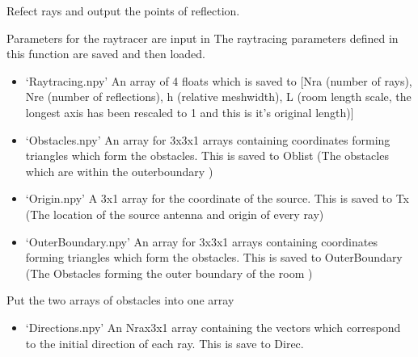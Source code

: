 \documentclass[letterpaper,10pt,english]{sphinxmanual}
\begin{document}
\begin{fulllineitems}
\label{\detokenize{index:RayTracerMainProgram.RayTracer}}
Refect rays and output the points of reflection.

Parameters for the raytracer are input in   {\hyperref[\detokenize{index:ParameterInput.DeclareParameters}]{}} The raytracing   parameters defined in this function are saved and then loaded.
\begin{itemize}
\item {} 
‘Raytracing.npy’ \sphinxhyphen{} An array of 4 floats which is saved to   {[}Nra (number of rays), Nre (number of reflections),   h (relative meshwidth),   L (room length scale, the longest axis has been rescaled to 1 and this   is it’s original length){]}

\item {} 
‘Obstacles.npy’  \sphinxhyphen{} An array for 3x3x1 arrays containing co\sphinxhyphen{}ordinates   forming triangles which form the obstacles. This is saved to Oblist   (The obstacles which are within the outerboundary )

\item {} 
‘Origin.npy’     \sphinxhyphen{} A 3x1 array for the co\sphinxhyphen{}ordinate of the source.   This is saved to Tx  (The location of the source antenna and origin   of every ray)

\item {} 
‘OuterBoundary.npy’ \sphinxhyphen{} An array for 3x3x1 arrays containing   co\sphinxhyphen{}ordinates forming triangles which form the obstacles. This is   saved to OuterBoundary   (The Obstacles forming the outer boundary of   the room )

\end{itemize}

Put the two arrays of obstacles into one array

\begin{sphinxVerbatim}[commandchars=\\\{\}]
\PYG{p}{[}\PYG{p}{]}
\end{sphinxVerbatim}
\begin{itemize}
\item {} 
‘Directions.npy’ \sphinxhyphen{} An Nrax3x1 array containing the vectors which   correspond to the initial direction of each ray. This is save to Direc.


\end{itemize}
\end{fulllineitems}
\end{document}
